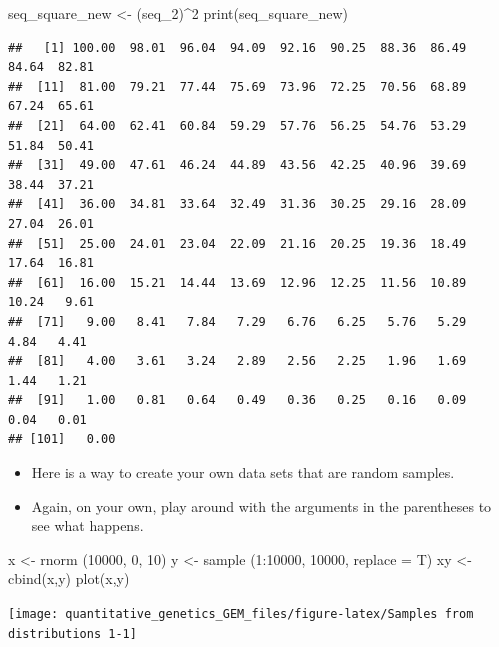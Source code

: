 \documentclass[
]{book}
\newenvironment{Shaded}{\begin{snugshade}}{\end{snugshade}}
\newcommand{\AttributeTok}[1]{\textcolor[rgb]{0.77,0.63,0.00}{#1}}
\newcommand{\DecValTok}[1]{\textcolor[rgb]{0.00,0.00,0.81}{#1}}
\newcommand{\FunctionTok}[1]{\textcolor[rgb]{0.00,0.00,0.00}{#1}}
\newcommand{\NormalTok}[1]{#1}
\newcommand{\OtherTok}[1]{\textcolor[rgb]{0.56,0.35,0.01}{#1}}
\newcommand{\SpecialCharTok}[1]{\textcolor[rgb]{0.00,0.00,0.00}{#1}}
\begin{document}
\begin{Shaded}
\begin{Highlighting}[]
\NormalTok{seq\_square\_new }\OtherTok{\textless{}{-}}\NormalTok{ (seq\_2)}\SpecialCharTok{\^{}}\DecValTok{2}
\FunctionTok{print}\NormalTok{(seq\_square\_new)}
\end{Highlighting}
\end{Shaded}

\begin{verbatim}
##   [1] 100.00  98.01  96.04  94.09  92.16  90.25  88.36  86.49  84.64  82.81
##  [11]  81.00  79.21  77.44  75.69  73.96  72.25  70.56  68.89  67.24  65.61
##  [21]  64.00  62.41  60.84  59.29  57.76  56.25  54.76  53.29  51.84  50.41
##  [31]  49.00  47.61  46.24  44.89  43.56  42.25  40.96  39.69  38.44  37.21
##  [41]  36.00  34.81  33.64  32.49  31.36  30.25  29.16  28.09  27.04  26.01
##  [51]  25.00  24.01  23.04  22.09  21.16  20.25  19.36  18.49  17.64  16.81
##  [61]  16.00  15.21  14.44  13.69  12.96  12.25  11.56  10.89  10.24   9.61
##  [71]   9.00   8.41   7.84   7.29   6.76   6.25   5.76   5.29   4.84   4.41
##  [81]   4.00   3.61   3.24   2.89   2.56   2.25   1.96   1.69   1.44   1.21
##  [91]   1.00   0.81   0.64   0.49   0.36   0.25   0.16   0.09   0.04   0.01
## [101]   0.00
\end{verbatim}

\begin{itemize}
\item
  Here is a way to create your own data sets that are random samples.
\item
  Again, on your own, play around with the arguments in the parentheses to see what happens.
\end{itemize}

\begin{Shaded}
\begin{Highlighting}[]
\NormalTok{x }\OtherTok{\textless{}{-}} \FunctionTok{rnorm}\NormalTok{ (}\DecValTok{10000}\NormalTok{, }\DecValTok{0}\NormalTok{, }\DecValTok{10}\NormalTok{)}
\NormalTok{y }\OtherTok{\textless{}{-}} \FunctionTok{sample}\NormalTok{ (}\DecValTok{1}\SpecialCharTok{:}\DecValTok{10000}\NormalTok{, }\DecValTok{10000}\NormalTok{, }\AttributeTok{replace =}\NormalTok{ T)}
\NormalTok{xy }\OtherTok{\textless{}{-}} \FunctionTok{cbind}\NormalTok{(x,y)}
\FunctionTok{plot}\NormalTok{(x,y) }
\end{Highlighting}
\end{Shaded}

\texttt{[image: quantitative\_genetics\_GEM\_files/figure-latex/Samples from distributions 1-1]}
\end{document}
